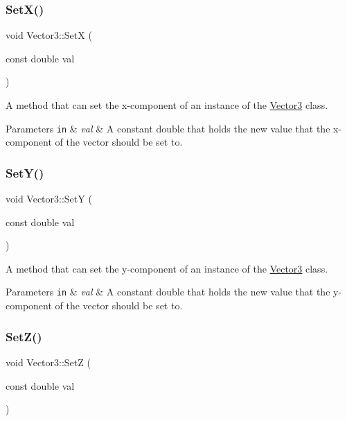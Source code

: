 \subsubsection{\texorpdfstring{Set\+X()}{SetX()}}
{\footnotesize\ttfamily void Vector3\+::\+SetX (\begin{DoxyParamCaption}\item[{const double}]{val }\end{DoxyParamCaption})}



A method that can set the x-\/component of an instance of the \hyperlink{classVector3}{Vector3} class. 


\begin{DoxyParams}[1]{Parameters}
\mbox{\tt in}  & {\em val} & A constant double that holds the new value that the x-\/component of the vector should be set to. \\
\hline
\end{DoxyParams}
\mbox{\label{classVector3_a93488ef1d624926521480f5d45270e5d}} 
\subsubsection{\texorpdfstring{Set\+Y()}{SetY()}}
{\footnotesize\ttfamily void Vector3\+::\+SetY (\begin{DoxyParamCaption}\item[{const double}]{val }\end{DoxyParamCaption})}



A method that can set the y-\/component of an instance of the \hyperlink{classVector3}{Vector3} class. 


\begin{DoxyParams}[1]{Parameters}
\mbox{\tt in}  & {\em val} & A constant double that holds the new value that the y-\/component of the vector should be set to. \\
\hline
\end{DoxyParams}
\mbox{\label{classVector3_a69c1d50b5ec7c02d4d8ecfc19030e996}} 
\subsubsection{\texorpdfstring{Set\+Z()}{SetZ()}}
{\footnotesize\ttfamily void Vector3\+::\+SetZ (\begin{DoxyParamCaption}\item[{const double}]{val }\end{DoxyParamCaption})}



